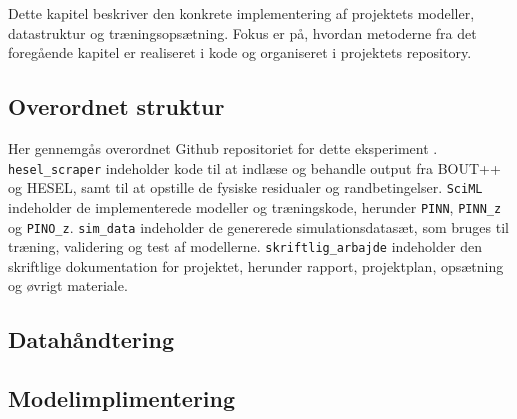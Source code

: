 
Dette kapitel beskriver den konkrete implementering af projektets modeller, datastruktur og træningsopsætning.
Fokus er på, hvordan metoderne fra det foregående kapitel er realiseret i kode og organiseret i projektets repository.

\subsection{Overordnet struktur} \label{ch3_1}

Her gennemgås overordnet Github repositoriet for dette eksperiment \cite{bsc_projekt}.
\texttt{hesel\_scraper} indeholder kode til at indlæse og behandle output fra BOUT++ og HESEL, samt til at opstille de fysiske residualer og randbetingelser.
\texttt{SciML} indeholder de implementerede modeller og træningskode, herunder \texttt{PINN}, \texttt{PINN\_z} og \texttt{PINO\_z}.
\texttt{sim\_data} indeholder de genererede simulationsdatasæt, som bruges til træning, validering og test af modellerne.
\texttt{skriftlig\_arbajde} indeholder den skriftlige dokumentation for projektet, herunder rapport, projektplan, opsætning og øvrigt materiale.

\subsection{Datahåndtering} \label{ch3_2}


\subsection{Modelimplimentering} \label{ch3_3}


% 
